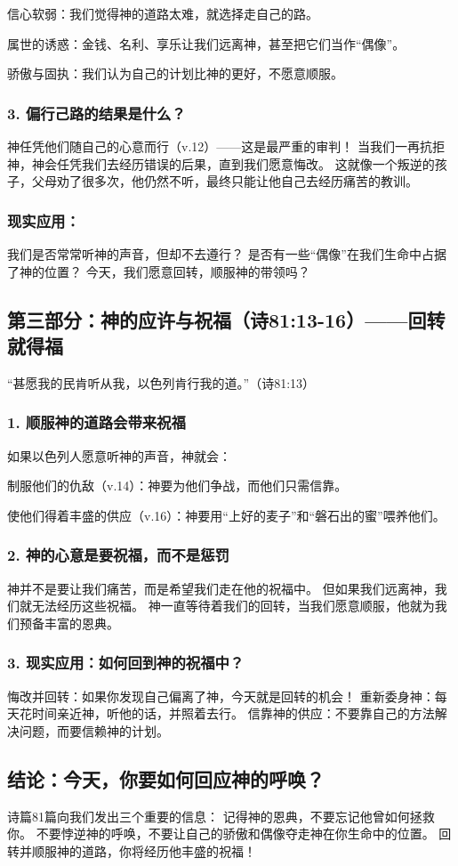 \documentclass[a4paper, 12pt]{article}
\begin{document}
\hspace{0.6cm}信心软弱：我们觉得神的道路太难，就选择走自己的路。

属世的诱惑：金钱、名利、享乐让我们远离神，甚至把它们当作“偶像”。

骄傲与固执：我们认为自己的计划比神的更好，不愿意顺服。
\subsubsection*{3. 偏行己路的结果是什么？}
神任凭他们随自己的心意而行（v.12）——这是最严重的审判！
当我们一再抗拒神，神会任凭我们去经历错误的后果，直到我们愿意悔改。
这就像一个叛逆的孩子，父母劝了很多次，他仍然不听，最终只能让他自己去经历痛苦的教训。
\subsubsection*{现实应用：}
我们是否常常听神的声音，但却不去遵行？
是否有一些“偶像”在我们生命中占据了神的位置？
今天，我们愿意回转，顺服神的带领吗？
\subsection*{第三部分：神的应许与祝福（诗81:13-16）——回转就得福}
“甚愿我的民肯听从我，以色列肯行我的道。”（诗81:13）
\subsubsection*{1. 顺服神的道路会带来祝福}
如果以色列人愿意听神的声音，神就会：

制服他们的仇敌（v.14）：神要为他们争战，而他们只需信靠。

使他们得着丰盛的供应（v.16）：神要用“上好的麦子”和“磐石出的蜜”喂养他们。
\subsubsection*{2. 神的心意是要祝福，而不是惩罚}
神并不是要让我们痛苦，而是希望我们走在他的祝福中。
但如果我们远离神，我们就无法经历这些祝福。
神一直等待着我们的回转，当我们愿意顺服，他就为我们预备丰富的恩典。
\subsubsection*{3. 现实应用：如何回到神的祝福中？}
悔改并回转：如果你发现自己偏离了神，今天就是回转的机会！
重新委身神：每天花时间亲近神，听他的话，并照着去行。
信靠神的供应：不要靠自己的方法解决问题，而要信赖神的计划。
\subsection*{结论：今天，你要如何回应神的呼唤？}
诗篇81篇向我们发出三个重要的信息：
记得神的恩典，不要忘记他曾如何拯救你。
不要悖逆神的呼唤，不要让自己的骄傲和偶像夺走神在你生命中的位置。
回转并顺服神的道路，你将经历他丰盛的祝福！
\end{document}
